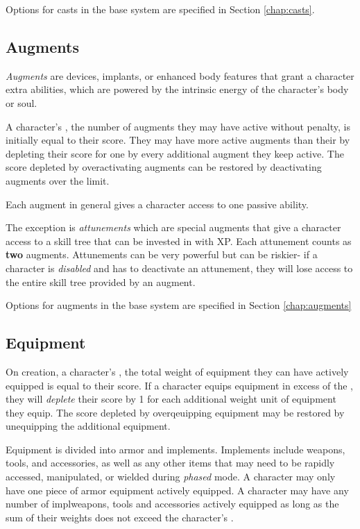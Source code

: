 Options for casts in the base system are specified in Section \ref{chap:casts}.

\subsection{Augments}

\emph{Augments} are devices, implants, or enhanced body features that grant a character extra abilities, which are powered by the intrinsic energy of the character's body or soul.

A character's , the number of augments they may have active without penalty, is initially equal to their  score. They may have more active augments than their  by depleting their  score for one by every additional augment they keep active. The  score depleted by overactivating augments can be restored by deactivating augments over the limit.

Each augment in general gives a character access to one passive ability.

The exception is \emph{attunements} which are special augments that give a character access to a skill tree that can be invested in with XP. Each attunement counts as \textbf{two} augments. Attunements can be very powerful but can be riskier- if a character is \emph{disabled} and has to deactivate an attunement, they will lose access to the entire skill tree provided by an augment.

Options for augments in the base system are specified in Section \ref{chap:augments}

\subsection{Equipment}

On creation, a character's , the total weight of equipment they can have actively equipped is equal to their  score. If a character equips equipment in excess of the , they will \emph{deplete} their  score by 1 for each additional weight unit of equipment they equip. The  score depleted by overqeuipping equipment may be restored by unequipping the additional equipment.

Equipment is divided into armor and implements. Implements include weapons, tools, and accessories, as well as any other items that may need to be rapidly accessed, manipulated, or wielded during \emph{phased} mode. A character may only have one piece of armor equipment actively equipped. A character may have any number of implweapons, tools and accessories actively equipped as long as the sum of their weights does not exceed the character's .

